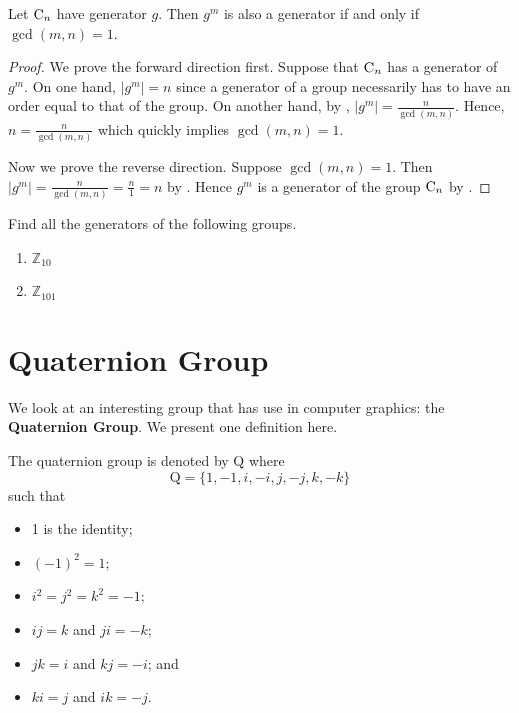 \begin{corollary}\label{corollary-element-in-cyclic-group-is-generator-iff-gcd-is-1}
    Let $\mathrm{C}_{n}$ have generator $g$. Then $g^m$ is also a generator if and only if $\gcd(m, n) = 1$.
\end{corollary}
\begin{proof}
    We prove the forward direction first. Suppose that $\mathrm{C}_{n}$ has a generator of $g^m$. On one hand, $|g^m| = n$ since a generator of a group necessarily has to have an order equal to that of the group. On another hand, by , $|g^m| = \frac{n}{\gcd(m, n)}$. Hence, $n = \frac{n}{\gcd(m, n)}$ which quickly implies $\gcd(m, n) = 1$.

    Now we prove the reverse direction. Suppose $\gcd(m,n) = 1$. Then $|g^m| = \frac{n}{\gcd(m,n)} = \frac{n}{1} = n$ by . Hence $g^m$ is a generator of the group $\mathrm{C}_{n}$ by .
\end{proof}

\begin{exercise}
    Find all the generators of the following groups.
    \begin{enumerate}[label=(\alph*)]
        \item $\mathbb{Z}_{10}$
        \item $\mathbb{Z}_{101}$
    \end{enumerate}
\end{exercise}

\newpage

\section{Quaternion Group}
We look at an interesting group that has use in computer graphics: the \textbf{Quaternion Group}. We present one definition here.
\begin{definition}\label{definition-quaternion-group}
    The quaternion group is denoted by $\mathrm{Q}$ where
    \[
            \mathrm{Q} = \{1, -1, i, -i, j, -j, k, -k\}
    \]
    such that
    \begin{multicols}{2}
        \begin{itemize}
            \item 1 is the identity;
            \item $(-1)^2 = 1$;
            \item $i^2 = j^2 = k^2 = -1$;
            \item $ij = k$ and $ji = -k$;
            \item $jk = i$ and $kj = -i$; and
            \item $ki = j$ and $ik = -j$.
        \end{itemize}
    \end{multicols}
\end{definition}

